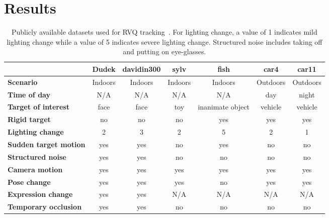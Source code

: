 %
%
%

\chapter{Results}
\label{chap_results}	


\begin{table}[t]
\caption{Publicly available datasets used for RVQ tracking~\cite{2008_JNL_subspaceTRK_Ross}.  For lighting change, a value of 1 indicates mild lighting change while a value of 5 indicates severe lighting change.  Structured noise includes taking off and putting on eye-glasses.}
\footnotesize
\centering
\begin{tabular}{|l|c|c|c|c|c|c|}\hline
							&\textbf{Dudek} & \textbf{davidin300} & \textbf{sylv} & \textbf{fish} & \textbf{car4} & \textbf{car11}\\\hline
\textbf{Scenario} 		&Indoors &Indoors &Indoors &Indoors &Outdoors &Outdoors\\\hline
\textbf{Time of day}	&N/A &N/A &N/A &N/A &day &night\\\hline
\textbf{Target of interest} &face &face & toy &inanimate object & vehicle & vehicle\\\hline
\textbf{Rigid target} &no &no & no &yes &yes &yes\\\hline
\textbf{Lighting change}	 &2 &3 &2 &5 &2 &1 \\\hline
\textbf{Sudden target motion} &yes &yes &no &yes &no &no\\\hline
\textbf{Structured noise}&yes &yes &no&no&no&no\\\hline
\textbf{Camera motion}&yes&yes&yes&yes&yes&yes\\\hline
\textbf{Pose change}&yes&yes&yes&no&yes&yes\\\hline
\textbf{Expression change}&yes&yes&N/A &N/A &N/A &N/A\\\hline
\textbf{Temporary occlusion}&yes&yes&no&no&no&no\\\hline
\end{tabular}
\label{Tab:datasets_used}
\end{table}

